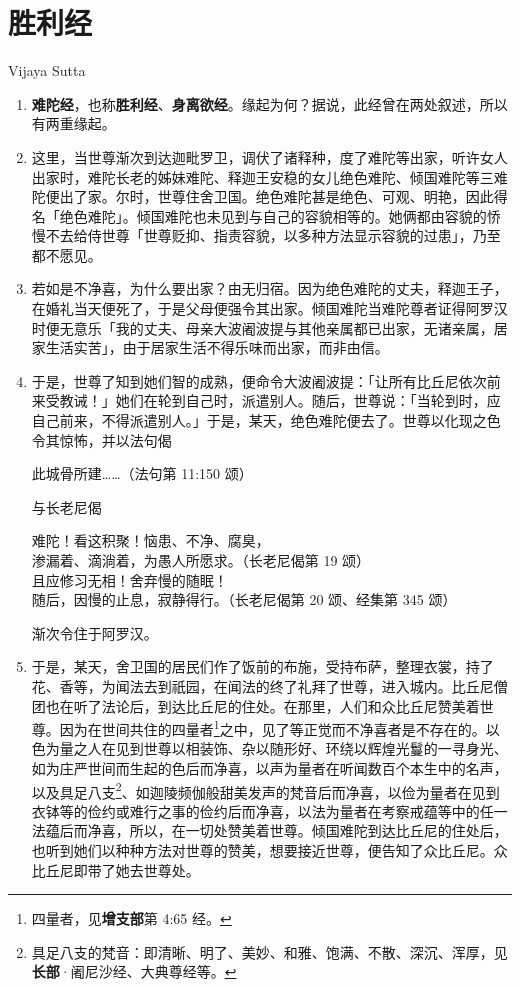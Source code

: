 \section{胜利经}

\begin{center}Vijaya Sutta\end{center}\vspace{1em}

\begin{enumerate}\item \textbf{难陀经}，也称\textbf{胜利经}、\textbf{身离欲经}。缘起为何？据说，此经曾在两处叙述，所以有两重缘起。
\item 这里，当世尊渐次到达迦毗罗卫，调伏了诸释种，度了难陀等出家，听许女人出家时，难陀长老的姊妹难陀、释迦王安稳的女儿绝色难陀、倾国难陀等三难陀便出了家。尔时，世尊住舍卫国。绝色难陀甚是绝色、可观、明艳，因此得名「绝色难陀」。倾国难陀也未见到与自己的容貌相等的。她俩都由容貌的㤭慢不去给侍世尊「世尊贬抑、指责容貌，以多种方法显示容貌的过患」，乃至都不愿见。
\item 若如是不净喜，为什么要出家？由无归宿。因为绝色难陀的丈夫，释迦王子，在婚礼当天便死了，于是父母便强令其出家。倾国难陀当难陀尊者证得阿罗汉时便无意乐「我的丈夫、母亲大波阇波提与其他亲属都已出家，无诸亲属，居家生活实苦」，由于居家生活不得乐味而出家，而非由信。
\item 于是，世尊了知到她们智的成熟，便命令大波阇波提：「让所有比丘尼依次前来受教诫！」她们在轮到自己时，派遣别人。随后，世尊说：「当轮到时，应自己前来，不得派遣别人。」于是，某天，绝色难陀便去了。世尊以化现之色令其惊怖，并以法句偈\begin{quoting}此城骨所建……（法句第 11:150 颂）\end{quoting}与长老尼偈\begin{quoting}难陀！看这积聚！恼患、不净、腐臭，\\渗漏着、滴淌着，为愚人所愿求。（长老尼偈第 19 颂）\\且应修习无相！舍弃慢的随眠！\\随后，因慢的止息，寂静得行。（长老尼偈第 20 颂、经集第 345 颂）\end{quoting}渐次令住于阿罗汉。
\item 于是，某天，舍卫国的居民们作了饭前的布施，受持布萨，整理衣裳，持了花、香等，为闻法去到祇园，在闻法的终了礼拜了世尊，进入城内。比丘尼僧团也在听了法论后，到达比丘尼的住处。在那里，人们和众比丘尼赞美着世尊。因为在世间共住的四量者\footnote{四量者，见\textbf{增支部}第 4:65 经。}之中，见了等正觉而不净喜者是不存在的。以色为量之人在见到世尊以相装饰、杂以随形好、环绕以辉煌光鬘的一寻身光、如为庄严世间而生起的色后而净喜，以声为量者在听闻数百个本生中的名声，以及具足八支\footnote{具足八支的梵音：即清晰、明了、美妙、和雅、饱满、不散、深沉、浑厚，见\textbf{长部}·阇尼沙经、大典尊经等。}、如迦陵频伽般甜美发声的梵音后而净喜，以俭为量者在见到衣钵等的俭约或难行之事的俭约后而净喜，以法为量者在考察戒蕴等中的任一法蕴后而净喜，所以，在一切处赞美着世尊。倾国难陀到达比丘尼的住处后，也听到她们以种种方法对世尊的赞美，想要接近世尊，便告知了众比丘尼。众比丘尼即带了她去世尊处。

\end{enumerate}
